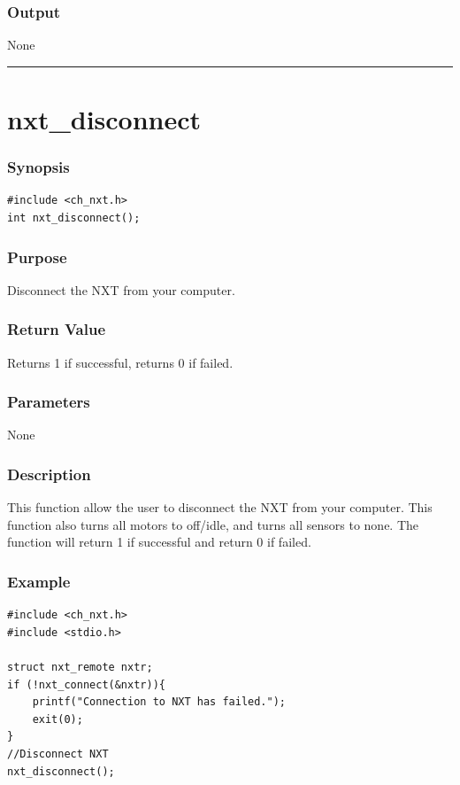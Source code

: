 \documentclass[12pt]{article}
\begin{document}
\subsubsection*{Output}
None 
\\

\hrule
\newpage
\section*{nxt\_disconnect}

\subsubsection*{Synopsis}
\begin{verbatim}
#include <ch_nxt.h>
int nxt_disconnect();
\end{verbatim}

\subsubsection*{Purpose}
Disconnect the NXT from your computer.

\subsubsection*{Return Value}
Returns 1 if successful, returns 0 if failed.

\subsubsection*{Parameters}
None

\subsubsection*{Description}
This function allow the user to disconnect the NXT from your computer. This function also turns all motors to off/idle, and turns all sensors to none. The function will return 1 if successful and return 0 if failed.

\subsubsection*{Example}
\begin{verbatim}
#include <ch_nxt.h> 
#include <stdio.h>

struct nxt_remote nxtr;
if (!nxt_connect(&nxtr)){
    printf("Connection to NXT has failed.");
    exit(0);
}
//Disconnect NXT
nxt_disconnect();    
\end{verbatim}
\end{document}
